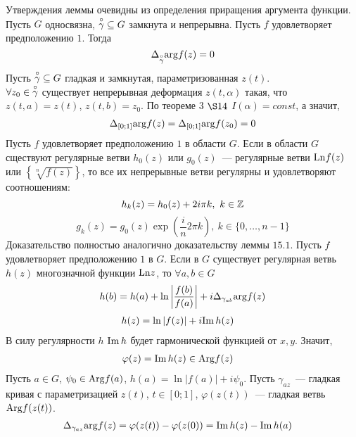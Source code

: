 \pr
Утверждения леммы очевидны из определения приращения аргумента функции.
\lemma
Пусть $G$ односвязна, $\overset{\circ}{\gamma} \subseteq G$ замкнута и непрерывна.
Пусть $f$ удовлетворяет предположению $1$. Тогда
\begin{equation}\label{(16.8)}
    \Delta_{\overset{\circ}{\gamma}}\mathrm{arg} f(z) = 0
\end{equation}
\pr
Пусть $\overset {\circ}{\gamma} \subseteq G$ гладкая и замкнутая, параметризованная
$z(t)$.
\\
$\forall z_0 \in \overset{\circ}{\gamma}$ существует непрерывная деформация $z(t,
\alpha)$ такая, что $z(t,a) = z(t)$, $z(t,b) = z_0$. По теореме $3$ $\S 14$
$I(\alpha) = const$, а значит,
\begin{align*}
  \Delta_{[0;1]}\mathrm{arg} f(z) = \Delta_{[0;1]}\mathrm{arg} f(z_0) = 0
\end{align*}
\lemma
Пусть $f$ удовлетворяет предположению $1$ в области $G$. Если в области $G$
сществуют регулярные ветви $h_0(z)$ или $g_0(z)$~--- регулярные ветви $\mathrm{Ln} f(z)$
или $\left\{ \sqrt[n]{f(z)} \right\}$, то все их непрерывные ветви регулярны и
удовлетворяют соотношениям:
\begin{equation}\label{(16.9)}
    h_k(z) = h_0(z) + 2i \pi k, \ k \in \mathbb{Z}
\end{equation}
\begin{equation}\label{(16.10)}
    g_k(z) = g_0(z) \exp\left( \frac{i}{n} 2 \pi k\right), \ k \in \{0, \dots, n-1\}
\end{equation}
\pr
Доказательство полностью аналогично доказательству леммы $15.1$.
\lemma
Пусть $f$ удовлетворяет предположению $1$ в $G$. Если в $G$ существует
регулярная ветвь $h(z)$ многозначной функции $\mathrm{Ln} z$, то $\forall a,b \in G$
\begin{equation}\label{(16.11)}
    h(b) = h(a) + \ln \left| \frac{f(b)}{f(a)} \right| + i \Delta_{\gamma_{ab}}\mathrm{arg} f(z)
\end{equation}
\pr
\begin{align*}
  & h(z) = \ln \left| f(z) \right| + i \mathrm{Im}\, h(z)
\end{align*}
В силу регулярности $h$ $\mathrm{Im}\, h$ будет гармонической функцией от $x, y$. Значит,
\begin{align*}
  & \varphi(z) = \mathrm{Im}\, h(z) \in \mathrm{Arg} f(z)
\end{align*}
Пусть $a \in G$, $\psi_0 \in \mathrm{Arg} f(a)$, $h(a) = \ln \left| f(a) \right| + i
\psi_0$. Пусть $\gamma_{az}$~--- гладкая кривая с параметризацией $z(t)$, $t \in
[0;1]$, $\varphi(z(t))$~--- гладкая ветвь $\mathrm{Arg} f(z(t))$.
\begin{align*}
  & \Delta_{\gamma_{az}}\mathrm{arg} f(z) = \varphi(z(t))-\varphi(z(0)) = \mathrm{Im}\, h(z) - \mathrm{Im}\, h(a)
\end{align*}
